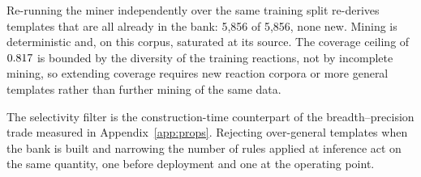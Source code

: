 Re-running the miner independently over the same training split re-derives templates that are all
already in the bank: 5{,}856 of 5{,}856, none new. Mining is deterministic and, on this corpus,
saturated at its source. The coverage ceiling of $0.817$ is bounded by the diversity of the
training reactions, not by incomplete mining, so extending coverage requires new reaction corpora
or more general templates rather than further mining of the same data.

The selectivity filter is the construction-time counterpart of the breadth--precision trade
measured in Appendix~\ref{app:props}. Rejecting over-general templates when the bank is built and
narrowing the number of rules applied at inference act on the same quantity, one before
deployment and one at the operating point.
